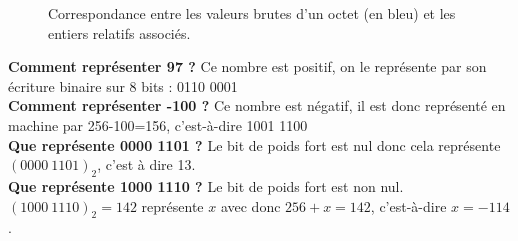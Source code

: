 \begin{figure}[H]
\begin{center}
    \end{center}
    \caption*{Correspondance entre les valeurs \og brutes \fg{} d'un octet (en bleu) et les entiers relatifs associés.}
\end{figure}
\begin{exemple}[s]
    \textbf{Comment représenter 97 ?} Ce nombre est positif, on le représente par son écriture binaire sur 8 bits : 0110
    0001\\

    \textbf{Comment représenter -100 ?} Ce nombre est négatif, il est donc représenté en machine par 256-100=156,
    c'est-à-dire 1001 1100\\

    \textbf{Que représente 0000 1101 ?} Le bit de poids fort est nul donc cela représente $(0000\ 1101)_2$, c'est à dire
    13.\\

    \textbf{Que représente 1000 1110 ?} Le bit de poids fort est non nul. $(1000\ 1110)_2=142$ représente $x$ avec donc
    $256+x=142$, c'est-à-dire $x=-114$.
\end{exemple}


